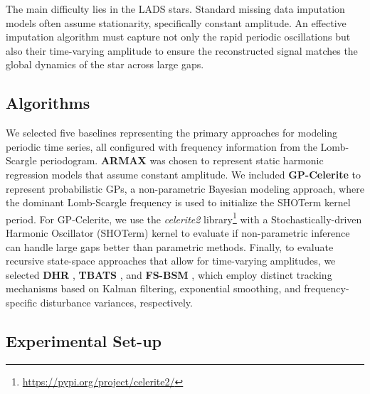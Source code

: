 \documentclass[a4paper,fleqn]{cas-sc}
\begin{document}
The main difficulty lies in the LADS stars. Standard missing data imputation models often assume stationarity, specifically constant amplitude. An effective imputation algorithm must capture not only the rapid periodic oscillations but also their time-varying amplitude to ensure the reconstructed signal matches the global dynamics of the star across large gaps.

\subsection{Algorithms}

 We selected five baselines representing the primary approaches for modeling periodic time series, all configured with frequency information from the Lomb-Scargle periodogram. \textbf{ARMAX} \cite{hyndman2018forecasting} was chosen to represent static harmonic regression models that assume constant amplitude. We included \textbf{GP-Celerite} \cite{foreman2017fast} to represent probabilistic GPs, a non-parametric Bayesian modeling approach, where the dominant Lomb-Scargle frequency is used to initialize the SHOTerm kernel period. For GP-Celerite, we use the \textit{celerite2} library\footnote{\url{https://pypi.org/project/celerite2/}} with a Stochastically-driven Harmonic Oscillator (SHOTerm) kernel to evaluate if non-parametric inference can handle large gaps better than parametric methods. Finally, to evaluate recursive state-space approaches that allow for time-varying amplitudes, we selected \textbf{DHR} \cite{young1999dynamic}, \textbf{TBATS} \cite{de2011forecasting}, and \textbf{FS-BSM} \cite{hindrayanto2013modelling}, which employ distinct tracking mechanisms based on Kalman filtering, exponential smoothing, and frequency-specific disturbance variances, respectively.



\subsection{Experimental Set-up}
\end{document}
